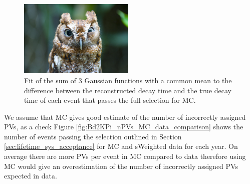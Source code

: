{\begin{figure}[htbp]
\centering
  \includegraphics[width=0.49\textwidth]{./Figs/placeholder.jpeg}
\caption{Fit of the sum of 3 Gaussian functions with a common mean to the difference between the reconstructed decay time and the true decay time of each event that passes the full selection for \bsmumu MC. }
\label{fig:resolution_fit_plot}
\end{figure}

 We assume that MC gives good estimate of the number of incorrectly assigned PVs, as a check Figure \ref{fig:Bd2KPi_nPVs_MC_data_comparison} shows the number of \bdkpi events passing the selection outlined in Section \ref{sec:lifetime_sys_acceptance} for MC and sWeighted data for each year. On average there are more PVs per event in MC compared to data therefore using MC would give an overestimation of the number of incorrectly assigned PVs expected in data. 

}

